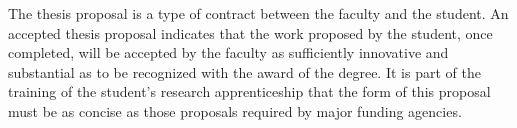 
The thesis proposal is a type of contract between the faculty and the student. 
An accepted thesis proposal indicates that the work proposed by the student, 
once completed, will be accepted by the faculty as sufficiently innovative and 
substantial as to be recognized with the award of the degree. It is part of 
the training of the student's research apprenticeship that the form of this 
proposal must be as concise as those proposals required by major funding 
agencies.
